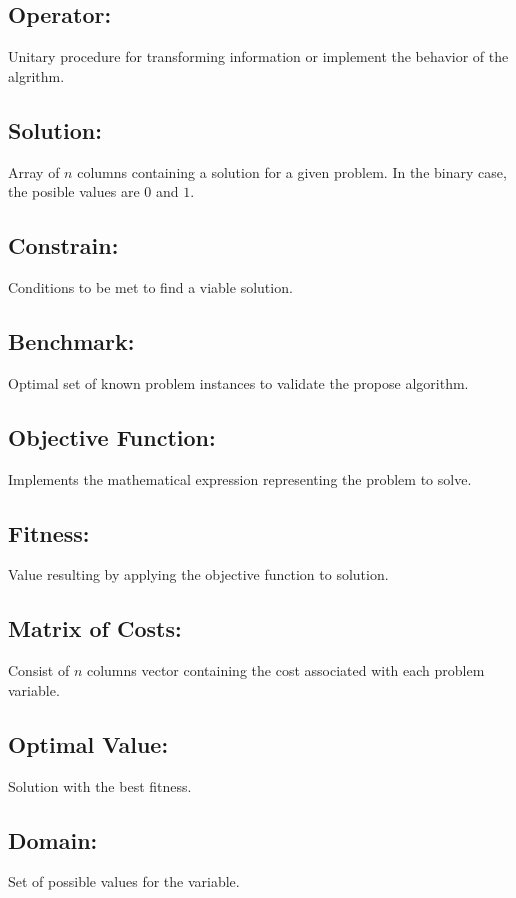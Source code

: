 \subsection{Operator:} Unitary procedure for transforming information or implement the behavior of the algrithm.

\subsection{Solution:} Array of $n$ columns containing a solution for a given problem. In the binary case, the posible values are $0$ and $1$.

\subsection{Constrain:} Conditions to be met to find a viable solution.

\subsection{Benchmark:} Optimal set of known problem instances to validate the propose algorithm.

\subsection{Objective Function:}  Implements the mathematical expression representing the problem to solve.

\subsection{Fitness:} Value resulting by applying the objective function to solution.

\subsection{Matrix of Costs:} Consist of $n$ columns vector containing the cost associated with each problem variable.

\subsection{Optimal Value:} Solution with the best fitness.

\subsection{Domain:} Set of possible values for the variable.

